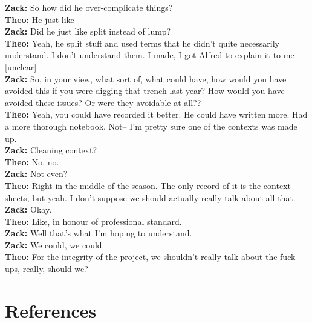 \documentclass[
]{article}
\begin{document}
\textbf{Zack:} So how did he over-complicate things?\\
\textbf{Theo:} He just like--\\
\textbf{Zack:} Did he just like split instead of lump?\\
\textbf{Theo:} Yeah, he split stuff and used terms that he didn't quite
necessarily understand. I don't understand them. I made, I got Alfred to
explain it to me {[}unclear{]}\\
\textbf{Zack:} So, in your view, what sort of, what could have, how
would you have avoided this if you were digging that trench last year?
How would you have avoided these issues? Or were they avoidable at
all??\\
\textbf{Theo:} Yeah, you could have recorded it better. He could have
written more. Had a more thorough notebook. Not-- I'm pretty sure one of
the contexts was made up.\\
\textbf{Zack:} Cleaning context?\\
\textbf{Theo:} No, no.\\
\textbf{Zack:} Not even?\\
\textbf{Theo:} Right in the middle of the season. The only record of it
is the context sheets, but yeah. I don't suppose we should actually
really talk about all that.\\
\textbf{Zack:} Okay.\\
\textbf{Theo:} Like, in honour of professional standard.\\
\textbf{Zack:} Well that's what I'm hoping to understand.\\
\textbf{Zack:} We could, we could.\\
\textbf{Theo:} For the integrity of the project, we shouldn't really
talk about the fuck ups, really, should we?

\newpage

\section{References}\label{references}
\end{document}
